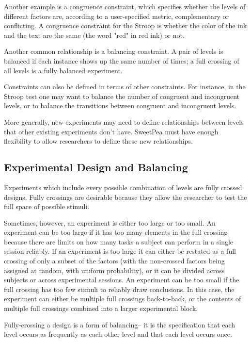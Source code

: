 Another example is a congruence constraint, which specifies whether the levels of different factors are, according to a user-specified metric, complementary or conflicting. A congruence constraint for the Stroop is whether the color of the ink and the text are the same (the word "red" in red ink) or not.

Another common relationship is a balancing constraint. A pair of levels is balanced if each instance shows up the same number of times; a full crossing of all levels is a fully balanced experiment.

Constraints can also be defined in terms of other constraints. For instance, in the Stroop test one may want to balance the number of congruent and incongruent levels, or to balance the transitions between congruent and incongruent levels.

More generally, new experiments may need to define relationships between levels that other existing experiments don't have. SweetPea must have enough flexibility to allow researchers to define these new relationships.

\subsection{Experimental Design and Balancing}

Experiments which include every possible combination of levels are fully crossed designs. Fully crossings are desirable because they allow the researcher to test the full space of possible stimuli.

Sometimes, however, an experiment is either too large or too small. An experiment can be too large if it has too many elements in the full crossing because there are limits on how many tasks a subject can perform in a single session reliably. If an experiment is too large it can either be restated as a full crossing of only a subset of the factors (with the non-crossed factors being assigned at random, with uniform probability), or it can be divided across subjects or across experimental sessions. An experiment can be too small if the full crossing has too few stimuli to reliably draw conclusions. In this case, the experiment can either be multiple full crossings back-to-back, or the contents of multiple full crossings combined into a larger experimental block.

Fully-crossing a design is a form of balancing-- it is the specification that each level occurs as frequently as each other level and that each level occurs once.

